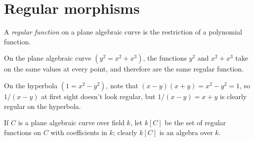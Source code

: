 \section{Regular morphisms}
A \emph{regular function} on a plane algebraic curve is the restriction of a polynomial function.
\begin{example}
On the plane algebraic curve \((y^2=x^2+x^3)\), the functions \(y^2\) and \(x^2+x^3\) take on the same values at every point, and therefore are the same regular function.
\end{example}
\begin{example}
On the hyperbola \((1=x^2-y^2)\), note that \((x-y)(x+y)=x^2-y^2=1\), so \(1/(x-y)\) at first sight doesn't look regular, but \(1/(x-y)=x+y\) is clearly regular on the hyperbola.
\end{example}
If \(C\) is a plane algebraic curve over field \(k\), let \(k[C]\) be the set of regular functions on \(C\) with coefficients in \(k\); clearly \(k[C]\) is an algebra over \(k\).

